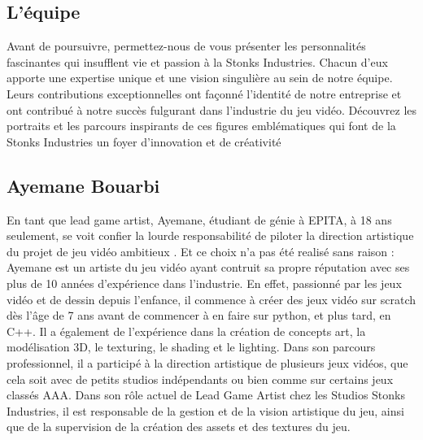 \subsection{L'équipe}

Avant de poursuivre, permettez-nous de vous présenter les personnalités fascinantes qui insufflent vie et passion à la Stonks Industries.
Chacun d'eux apporte une expertise unique et une vision singulière au sein de notre équipe.
Leurs contributions exceptionnelles ont façonné l'identité de notre entreprise et ont contribué à notre succès fulgurant dans l'industrie du jeu vidéo.
Découvrez les portraits et les parcours inspirants de ces figures emblématiques qui font de la Stonks Industries un foyer d'innovation et de créativité

\subsection*{Ayemane Bouarbi}
En tant que lead game artist, Ayemane, étudiant de génie à EPITA, à 18 ans seulement,
se voit confier la lourde responsabilité de piloter la direction artistique du projet de jeu vidéo
ambitieux \gameName. Et ce choix n'a pas été realisé sans raison : Ayemane est un artiste
du jeu vidéo ayant contruit sa propre réputation avec ses plus de 10 années d'expérience dans
l'industrie. En effet, passionné par les jeux vidéo et de dessin depuis l'enfance, il commence à
créer des jeux vidéo sur scratch dès l'âge de 7 ans avant de commencer à en faire sur python,
et plus tard, en C++. Il a également de l'expérience dans la création de concepts art, la
modélisation 3D, le texturing, le shading et le lighting. Dans son parcours professionnel, il a
participé à la direction artistique de plusieurs jeux vidéos, que cela soit avec de petits studios
indépendants ou bien comme sur certains jeux classés AAA. Dans son rôle actuel de Lead
Game Artist chez les Studios Stonks Industries, il est responsable de la gestion et de la vision
artistique du jeu, ainsi que de la supervision de la création des assets et des textures du jeu.
\\

